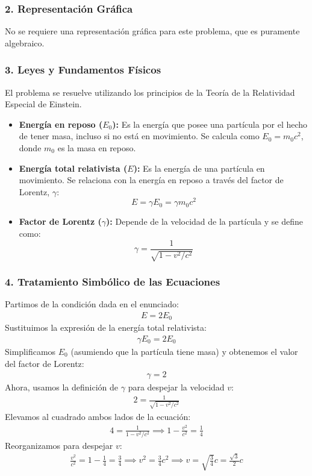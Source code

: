 \subsubsection*{2. Representación Gráfica}
No se requiere una representación gráfica para este problema, que es puramente algebraico.

\subsubsection*{3. Leyes y Fundamentos Físicos}
El problema se resuelve utilizando los principios de la Teoría de la Relatividad Especial de Einstein.
\begin{itemize}
    \item \textbf{Energía en reposo ($E_0$):} Es la energía que posee una partícula por el hecho de tener masa, incluso si no está en movimiento. Se calcula como $E_0 = m_0c^2$, donde $m_0$ es la masa en reposo.
    \item \textbf{Energía total relativista ($E$):} Es la energía de una partícula en movimiento. Se relaciona con la energía en reposo a través del factor de Lorentz, $\gamma$:
    $$ E = \gamma E_0 = \gamma m_0 c^2 $$
    \item \textbf{Factor de Lorentz ($\gamma$):} Depende de la velocidad de la partícula y se define como:
    $$ \gamma = \frac{1}{\sqrt{1 - v^2/c^2}} $$
\end{itemize}

\subsubsection*{4. Tratamiento Simbólico de las Ecuaciones}
Partimos de la condición dada en el enunciado:
\begin{gather}
    E = 2E_0
\end{gather}
Sustituimos la expresión de la energía total relativista:
\begin{gather}
    \gamma E_0 = 2E_0
\end{gather}
Simplificamos $E_0$ (asumiendo que la partícula tiene masa) y obtenemos el valor del factor de Lorentz:
\begin{gather}
    \gamma = 2
\end{gather}
Ahora, usamos la definición de $\gamma$ para despejar la velocidad $v$:
\begin{gather}
    2 = \frac{1}{\sqrt{1 - v^2/c^2}}
\end{gather}
Elevamos al cuadrado ambos lados de la ecuación:
\begin{gather}
    4 = \frac{1}{1 - v^2/c^2} \implies 1 - \frac{v^2}{c^2} = \frac{1}{4}
\end{gather}
Reorganizamos para despejar $v$:
\begin{gather}
    \frac{v^2}{c^2} = 1 - \frac{1}{4} = \frac{3}{4} \implies v^2 = \frac{3}{4}c^2 \implies v = \sqrt{\frac{3}{4}}c = \frac{\sqrt{3}}{2}c
\end{gather}

